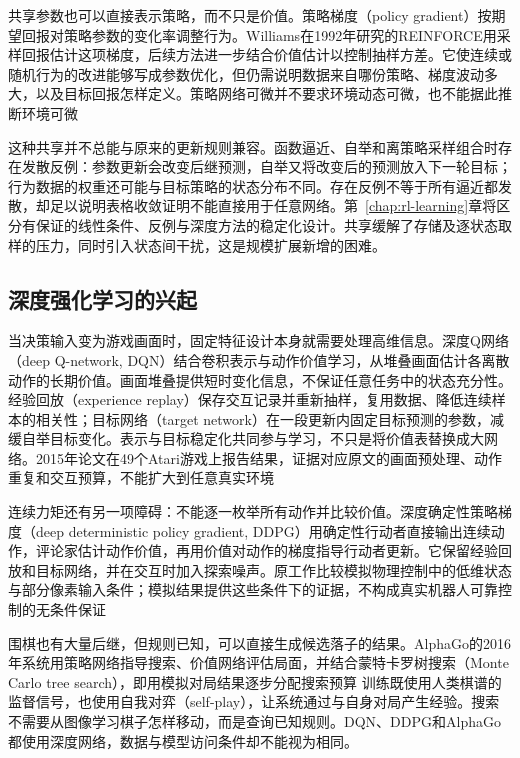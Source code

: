 共享参数也可以直接表示策略，而不只是价值。策略梯度（policy gradient）按期望回报对策略参数的变化率调整行为。Williams在1992年研究的REINFORCE用采样回报估计这项梯度，后续方法进一步结合价值估计以控制抽样方差。它使连续或随机行为的改进能够写成参数优化，但仍需说明数据来自哪份策略、梯度波动多大，以及目标回报怎样定义。策略网络可微并不要求环境动态可微，也不能据此推断环境可微

这种共享并不总能与原来的更新规则兼容。函数逼近、自举和离策略采样组合时存在发散反例：参数更新会改变后继预测，自举又将改变后的预测放入下一轮目标；行为数据的权重还可能与目标策略的状态分布不同。存在反例不等于所有逼近都发散，却足以说明表格收敛证明不能直接用于任意网络。第~\ref{chap:rl-learning}章将区分有保证的线性条件、反例与深度方法的稳定化设计。共享缓解了存储及逐状态取样的压力，同时引入状态间干扰，这是规模扩展新增的困难。

\subsection{深度强化学习的兴起}
\label{sec:rl-overview-deep}

当决策输入变为游戏画面时，固定特征设计本身就需要处理高维信息。深度Q网络（deep Q-network, DQN）结合卷积表示与动作价值学习，从堆叠画面估计各离散动作的长期价值。画面堆叠提供短时变化信息，不保证任意任务中的状态充分性。经验回放（experience replay）保存交互记录并重新抽样，复用数据、降低连续样本的相关性；目标网络（target network）在一段更新内固定目标预测的参数，减缓自举目标变化。表示与目标稳定化共同参与学习，不只是将价值表替换成大网络。2015年论文在49个Atari游戏上报告结果，证据对应原文的画面预处理、动作重复和交互预算，不能扩大到任意真实环境

连续力矩还有另一项障碍：不能逐一枚举所有动作并比较价值。深度确定性策略梯度（deep deterministic policy gradient, DDPG）用确定性行动者直接输出连续动作，评论家估计动作价值，再用价值对动作的梯度指导行动者更新。它保留经验回放和目标网络，并在交互时加入探索噪声。原工作比较模拟物理控制中的低维状态与部分像素输入条件；模拟结果提供这些条件下的证据，不构成真实机器人可靠控制的无条件保证

围棋也有大量后继，但规则已知，可以直接生成候选落子的结果。AlphaGo的2016年系统用策略网络指导搜索、价值网络评估局面，并结合蒙特卡罗树搜索（Monte Carlo tree search），即用模拟对局结果逐步分配搜索预算
训练既使用人类棋谱的监督信号，也使用自我对弈（self-play），让系统通过与自身对局产生经验。搜索不需要从图像学习棋子怎样移动，而是查询已知规则。DQN、DDPG和AlphaGo都使用深度网络，数据与模型访问条件却不能视为相同。

